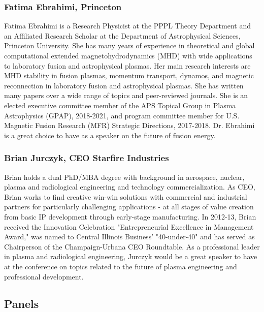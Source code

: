 \subsubsection{Fatima Ebrahimi, Princeton}
Fatima Ebrahimi is a Research Physicist at the PPPL Theory Department
and an Affiliated Research Scholar at the Department of Astrophysical
Sciences, Princeton University. She has many years of experience in theoretical and global computational extended magnetohydrodynamics (MHD) with wide applications to laboratory fusion and astrophysical plasmas. Her main research interests are MHD
stability in fusion plasmas, momentum transport, dynamos, and magnetic reconnection in laboratory fusion and astrophysical plasmas. She has written many papers over a wide range of topics and peer-reviewed journals. She is an elected executive committee member
of the APS Topical Group in Plasma Astrophysics (GPAP), 2018-2021, and program committee member for U.S. Magnetic Fusion Research (MFR) Strategic Directions, 2017-2018. Dr. Ebrahimi is a great choice to have as a speaker on the future of fusion energy. 

\subsubsection{Brian Jurczyk, CEO Starfire Industries}
Brian holds a dual PhD/MBA degree with background in aerospace, nuclear, plasma and radiological engineering and technology commercialization.  As CEO, Brian works to find creative win-win solutions with commercial and industrial partners for particularly challenging applications - at all stages of value creation from basic IP development through early-stage manufacturing.  In 2012-13, Brian received the Innovation Celebration "Entrepreneurial Excellence in Management Award," was named to Central Illinois Business' "40-under-40" and has served as Chairperson of the Champaign-Urbana CEO Roundtable. As a professional leader in plasma and radiological engineering, Jurczyk would be a great speaker to have at the conference on topics related to the future of plasma engineering and professional development.

\subsection{Panels}

